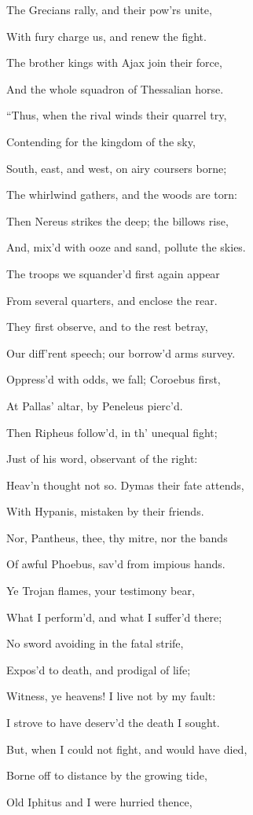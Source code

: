 The Grecians rally, and their pow’rs unite,

With fury charge us, and renew the fight.

The brother kings with Ajax join their force,

And the whole squadron of Thessalian horse.

“Thus, when the rival winds their quarrel try,

Contending for the kingdom of the sky,

South, east, and west, on airy coursers borne;

The whirlwind gathers, and the woods are torn:

Then Nereus strikes the deep; the billows rise,

And, mix’d with ooze and sand, pollute the skies.

The troops we squander’d first again appear

From several quarters, and enclose the rear.

They first observe, and to the rest betray,

Our diff’rent speech; our borrow’d arms survey.

Oppress’d with odds, we fall; Coroebus first,

At Pallas’ altar, by Peneleus pierc’d.

Then Ripheus follow’d, in th’ unequal fight;

Just of his word, observant of the right:

Heav’n thought not so. Dymas their fate attends,

With Hypanis, mistaken by their friends.

Nor, Pantheus, thee, thy mitre, nor the bands

Of awful Phoebus, sav’d from impious hands.

Ye Trojan flames, your testimony bear,

What I perform’d, and what I suffer’d there;

No sword avoiding in the fatal strife,

Expos’d to death, and prodigal of life;

Witness, ye heavens! I live not by my fault:

I strove to have deserv’d the death I sought.

But, when I could not fight, and would have died,

Borne off to distance by the growing tide,

Old Iphitus and I were hurried thence,

